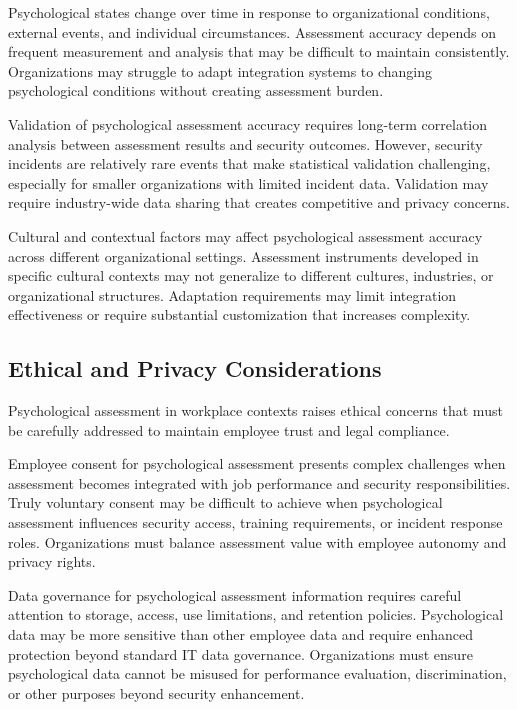 \documentclass[10pt, twocolumn]{article}
\begin{document}
Psychological states change over time in response to organizational conditions, external events, and individual circumstances. Assessment accuracy depends on frequent measurement and analysis that may be difficult to maintain consistently. Organizations may struggle to adapt integration systems to changing psychological conditions without creating assessment burden.

Validation of psychological assessment accuracy requires long-term correlation analysis between assessment results and security outcomes. However, security incidents are relatively rare events that make statistical validation challenging, especially for smaller organizations with limited incident data. Validation may require industry-wide data sharing that creates competitive and privacy concerns.

Cultural and contextual factors may affect psychological assessment accuracy across different organizational settings. Assessment instruments developed in specific cultural contexts may not generalize to different cultures, industries, or organizational structures. Adaptation requirements may limit integration effectiveness or require substantial customization that increases complexity.

\subsection{Ethical and Privacy Considerations}

Psychological assessment in workplace contexts raises ethical concerns that must be carefully addressed to maintain employee trust and legal compliance.

Employee consent for psychological assessment presents complex challenges when assessment becomes integrated with job performance and security responsibilities. Truly voluntary consent may be difficult to achieve when psychological assessment influences security access, training requirements, or incident response roles. Organizations must balance assessment value with employee autonomy and privacy rights.

Data governance for psychological assessment information requires careful attention to storage, access, use limitations, and retention policies. Psychological data may be more sensitive than other employee data and require enhanced protection beyond standard IT data governance. Organizations must ensure psychological data cannot be misused for performance evaluation, discrimination, or other purposes beyond security enhancement.
\end{document}
